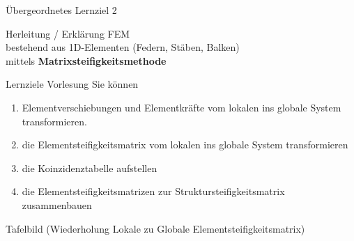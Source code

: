 \documentclass[aspectratio=169,professionalfonts]{beamer}
\begin{document}
\begin{frame}{Übergeordnetes Lernziel 2}
  \centering
  \begin{minipage}{0.9\linewidth}
    \centering
    {\LARGE  Herleitung / Erklärung FEM\\[0.6em]}
    {\Large bestehend aus 1D-Elementen (Federn, Stäben, Balken)\\[0.4em]}
    {\Large mittels \textbf{Matrixsteifigkeitsmethode}}
  \end{minipage}
\end{frame}

\begin{frame}{Lernziele Vorlesung}
  \small
  Sie können
  \begin{enumerate}
    \item Elementverschiebungen und Elementkräfte vom lokalen ins globale System transformieren.
        \item die Elementsteifigkeitsmatrix vom lokalen
ins globale System transformieren
            \item die
Koinzidenztabelle aufstellen
\item die Elementsteifigkeitsmatrizen zur
Struktursteifigkeitsmatrix zusammenbauen 
  \end{enumerate}
\end{frame}
\begin{frame}{Tafelbild (Wiederholung Lokale zu Globale Elementsteifigkeitsmatrix)}
  \centering
\end{frame}
\end{document}
